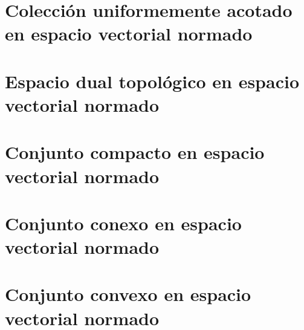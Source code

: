 \section{Colección uniformemente acotado en espacio vectorial normado}

\section{Espacio dual topológico en espacio vectorial normado}

\section{Conjunto compacto en espacio vectorial normado}

\section{Conjunto conexo en espacio vectorial normado}

\section{Conjunto convexo en espacio vectorial normado}

